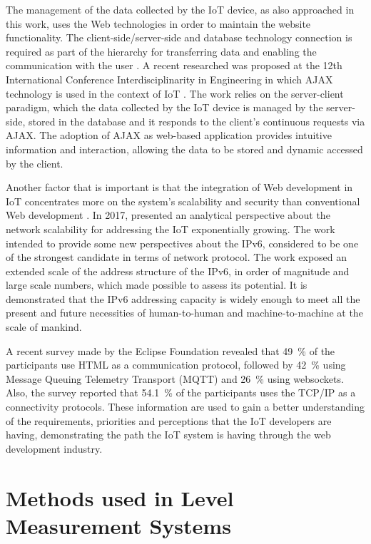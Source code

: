 The management of the data collected by the \gls{IoT} device, as also approached in this work, uses the Web technologies in order to maintain the website functionality. The client-side/server-side and database technology connection is required as part of the hierarchy for transferring data and enabling the communication with the user \cite{WEBDEVELOPMENT:2019, AGGARWAL:2019}. A recent researched was proposed at the 12th International Conference Interdisciplinarity in Engineering in which \gls{AJAX} technology is used in the context of \gls{IoT} \cite{TURC:2019}. The work relies on the server-client paradigm, which the data collected by the \gls{IoT} device is managed by the server-side, stored in the database and it responds to the client's continuous requests via \gls{AJAX}. The adoption of \gls{AJAX} as web-based application provides intuitive information and interaction, allowing the data to be stored and dynamic accessed by the client. 

Another factor that is important is that the integration of Web development in \gls{IoT} concentrates more on the system's scalability and security than conventional Web development \cite{AGGARWAL:2019}. In 2017, \cite{ZIEGLER:2017} presented an analytical perspective about the network scalability for addressing the \gls{IoT} exponentially growing. The work intended to provide some new perspectives about the \gls{IPv6}, considered to be one of the strongest candidate in terms of network protocol. The work exposed an extended scale of the address structure of the \gls{IPv6}, in order of magnitude and large scale numbers, which made possible to assess its potential. It is demonstrated that the \gls{IPv6} addressing capacity is widely enough to meet all the present and future necessities of human-to-human and machine-to-machine at the scale of mankind.

A recent survey made by the Eclipse Foundation \cite{ECLIPSE-SURVEY:2019} revealed that 49~\% of the participants use \gls{HTML} as a communication protocol, followed by 42~\% using Message Queuing Telemetry Transport (MQTT) and 26~\% using websockets. Also, the survey reported that 54.1~\% of the participants uses the \gls{TCP}/\gls{IP} as a connectivity protocols. These information are used to gain a better understanding of the requirements, priorities and perceptions that the \gls{IoT} developers are having, demonstrating the path the \gls{IoT} system is having through the web development industry. 


\section{Methods used in Level Measurement Systems}


